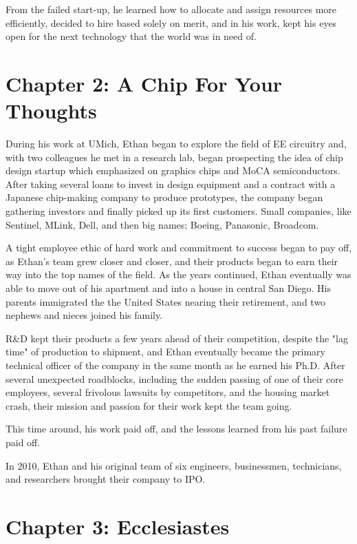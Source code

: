 \documentclass[a4paper,12pt,twoside]{book}
\begin{document}
From the failed start-up, he learned how to allocate and assign resources more efficiently, decided to hire based solely on merit, and in his work, kept his eyes open for the next technology that the world was in need of.


\chapter{Chapter 2: A Chip For Your Thoughts}

During his work at UMich,  Ethan began to explore the field of EE circuitry and, with two colleagues he met in a research lab, began prospecting the idea of chip design startup which emphasized on graphics chips and MoCA semiconductors.  After taking several loans to invest in design equipment and a contract with a Japanese chip-making company to produce prototypes, the company began gathering investors and finally picked up its first customers.  Small companies, like Sentinel, MLink, Dell, and then big names; Boeing, Panasonic, Broadcom.

A tight employee ethic of hard work and commitment to success began to pay off, as Ethan's team grew closer and closer, and their products began to earn their way into the top names of the field.  As the years continued, Ethan eventually was able to move out of his apartment and into a house in central San Diego.  His parents immigrated the the United States nearing their retirement, and two nephews and nieces joined his family. 

R&D kept their products a few years ahead of their competition, despite the "lag time" of production to shipment, and Ethan eventually became the primary technical officer of the company in the same month as he earned his Ph.D.  After several unexpected roadblocks, including the sudden passing of one of their core employees, several frivolous lawsuits by competitors, and the housing market crash, their mission and passion for their work kept the team going.  

This time around, his work paid off, and the lessons learned from his past failure paid off. 

In 2010, Ethan and his original team of six engineers, businessmen, technicians, and researchers brought their company to IPO. 


\chapter{Chapter 3: Ecclesiastes}
\end{document}
